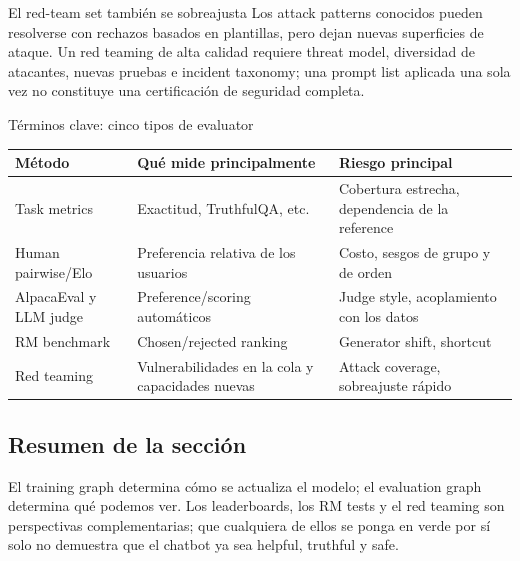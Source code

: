 
\begin{warningbox}{El red-team set también se sobreajusta}
Los attack patterns conocidos pueden resolverse con rechazos basados en plantillas, pero dejan nuevas superficies de ataque. Un red teaming de alta calidad requiere threat model, diversidad de atacantes, nuevas pruebas e incident taxonomy; una prompt list aplicada una sola vez no constituye una certificación de seguridad completa.
\end{warningbox}

\begin{knowledgebox}{Términos clave: cinco tipos de evaluator}
\begin{tabularx}{\textwidth}{@{}L{0.17\textwidth}L{0.24\textwidth}X@{}}
\toprule
Método & Qué mide principalmente & Riesgo principal \\
\midrule
Task metrics & Exactitud, TruthfulQA, etc. & Cobertura estrecha, dependencia de la reference \\
Human pairwise/Elo & Preferencia relativa de los usuarios & Costo, sesgos de grupo y de orden \\
AlpacaEval y LLM judge & Preference/scoring automáticos & Judge style, acoplamiento con los datos \\
RM benchmark & Chosen/rejected ranking & Generator shift, shortcut \\
Red teaming & Vulnerabilidades en la cola y capacidades nuevas & Attack coverage, sobreajuste rápido \\
\bottomrule
\end{tabularx}
\end{knowledgebox}

\subsection{Resumen de la sección}

El training graph determina cómo se actualiza el modelo; el evaluation graph determina qué podemos ver. Los leaderboards, los RM tests y el red teaming son perspectivas complementarias; que cualquiera de ellos se ponga en verde por sí solo no demuestra que el chatbot ya sea helpful, truthful y safe.
